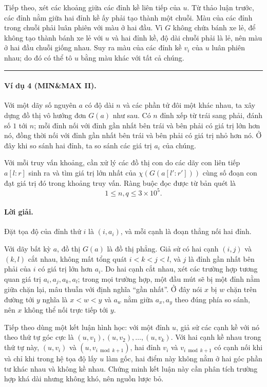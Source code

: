 \documentclass[11pt]{article}
\begin{document}
Tiếp theo, xét các khoảng giữa các đỉnh kề liên tiếp của $u$. Từ thảo luận
trước, các đỉnh nằm giữa hai đỉnh kề ấy phải tạo thành một chuỗi. Màu của các
đỉnh trong chuỗi phải luân phiên với màu ở hai đầu. Vì $G$ không chứa bánh xe
lẻ, để không tạo thành bánh xe lẻ với $u$ và hai đỉnh kề, độ dài chuỗi phải là
lẻ, nên màu ở hai đầu chuỗi giống nhau. Suy ra màu của các đỉnh kề $v_i$ của
$u$ luân phiên nhau; do đó có thể tô $u$ bằng màu khác với tất cả chúng.
\hfill\rule{0.55em}{0.55em}

\paragraph{Ví dụ 4 (MIN\&MAX II).}
Với một dãy số nguyên $a$ có độ dài $n$ và các phần tử đôi một khác nhau, ta xây
dựng đồ thị vô hướng đơn $G(a)$ như sau. Có $n$ đỉnh xếp từ trái sang phải,
đánh số $1$ tới $n$; mỗi đỉnh nối với đỉnh gần nhất bên trái và bên phải có giá
trị lớn hơn nó, đồng thời nối với đỉnh gần nhất bên trái và bên phải có giá trị
nhỏ hơn nó. Ở đây khi so sánh hai đỉnh, ta so sánh các giá trị $a_i$ của chúng.

Với mỗi truy vấn khoảng, cần xử lý các đồ thị con do các dãy con liên tiếp
$a[l:r]$ sinh ra và tìm giá trị lớn nhất của $\chi(G(a[l':r']))$ cùng số đoạn
con đạt giá trị đó trong khoảng truy vấn. Ràng buộc đọc được từ bản quét là
\[
  1\le n,q\le 3\times 10^5.
\]

\paragraph{Lời giải.}
Đặt tọa độ của đỉnh thứ $i$ là $(i,a_i)$, và mỗi cạnh là đoạn thẳng nối hai
đỉnh.

Với dãy bất kỳ $a$, đồ thị $G(a)$ là đồ thị phẳng. Giả sử có hai cạnh
$(i,j)$ và $(k,l)$ cắt nhau, không mất tổng quát $i<k<j<l$, và $j$ là đỉnh gần
nhất bên phải của $i$ có giá trị lớn hơn $a_i$. Do hai cạnh cắt nhau, xét các
trường hợp tương quan giá trị $a_i,a_j,a_k,a_l$; trong mọi trường hợp, một đầu
mút sẽ bị một đỉnh nằm giữa chặn lại, mâu thuẫn với định nghĩa ``gần nhất''.
Ở đây nói $x$ bị $w$ chặn trên đường tới $y$ nghĩa là $x<w<y$ và $a_w$ nằm giữa
$a_x,a_y$ theo đúng phía so sánh, nên $x$ không thể nối trực tiếp tới $y$.

Tiếp theo dùng một kết luận hình học: với một đỉnh $u$, giả sử các cạnh kề với
nó theo thứ tự góc cực là
$(u,v_1),(u,v_2),\ldots,(u,v_k)$. Với hai cạnh kề nhau trong thứ tự này,
$(u,v_i)$ và $(u,v_{i\bmod k+1})$, hai đỉnh $v_i$ và $v_{i\bmod k+1}$ có cạnh
nối khi và chỉ khi trong hệ tọa độ lấy $u$ làm gốc, hai điểm này không nằm ở hai
góc phần tư khác nhau và không kề nhau. Chứng minh kết luận này cần phân tích
trường hợp khá dài nhưng không khó, nên nguồn lược bỏ.
\end{document}
